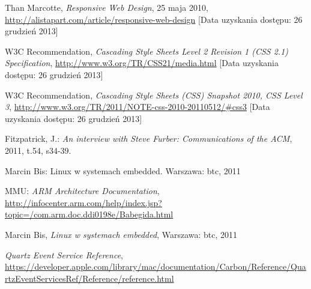 \begin{thebibliography}{1}
   Than Marcotte, \emph{Responsive Web Design}, 25 maja 2010, \url{http://alistapart.com/article/responsive-web-design} [Data uzyskania dostępu: 26 grudzień 2013]

   W3C Recommendation, \emph{Cascading Style Sheets Level 2 Revision 1 (CSS 2.1) Specification}, \url{http://www.w3.org/TR/CSS21/media.html} [Data uzyskania dostępu: 26 grudzień 2013]

   W3C Recommendation, \emph{Cascading Style Sheets (CSS) Snapshot 2010, CSS Level 3}, \url{http://www.w3.org/TR/2011/NOTE-css-2010-20110512/\#css3} [Data uzyskania dostępu: 26 grudzień 2013]

  Fitzpatrick, J.: \emph{An interview with Steve Furber: Communications of the ACM}, 2011, t.54, s34-39.
  
  Marcin Bis: Linux w systemach embedded. Warszawa: btc, 2011

  MMU: \emph{ARM Architecture Documentation}, \url{http://infocenter.arm.com/help/index.jsp?topic=/com.arm.doc.ddi0198e/Babegida.html}

  Marcin Bis, \emph{Linux w systemach embedded}, Warszawa: btc, 2011

   \emph{Quartz Event Service Reference}, \url{https://developer.apple.com/library/mac/documentation/Carbon/Reference/QuartzEventServicesRef/Reference/reference.html}

\end{thebibliography}
\listoftables

\listoffigures











